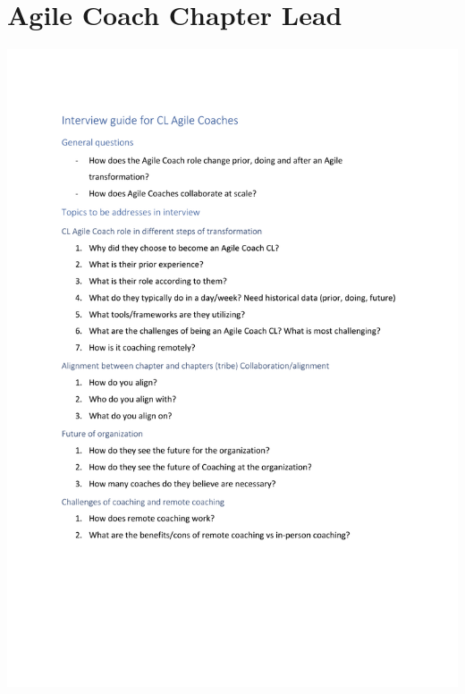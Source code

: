 \documentclass[11pt,a4paper]{report}
\begin{document}
\section{Agile Coach Chapter Lead}
\label{acCLInterviewTemplate}
\includegraphics[scale=0.99,page=1]{clInterview.pdf}
\newpage
\end{document}
